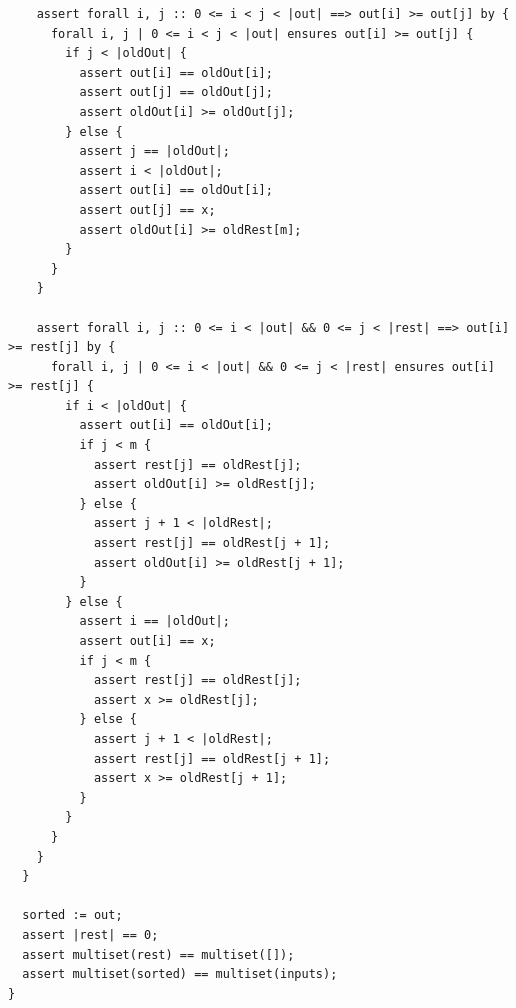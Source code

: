 \documentclass{article}
\begin{document}
\begin{lstlisting}
    assert forall i, j :: 0 <= i < j < |out| ==> out[i] >= out[j] by {
      forall i, j | 0 <= i < j < |out| ensures out[i] >= out[j] {
        if j < |oldOut| {
          assert out[i] == oldOut[i];
          assert out[j] == oldOut[j];
          assert oldOut[i] >= oldOut[j];
        } else {
          assert j == |oldOut|;
          assert i < |oldOut|;
          assert out[i] == oldOut[i];
          assert out[j] == x;
          assert oldOut[i] >= oldRest[m];
        }
      }
    }

    assert forall i, j :: 0 <= i < |out| && 0 <= j < |rest| ==> out[i] >= rest[j] by {
      forall i, j | 0 <= i < |out| && 0 <= j < |rest| ensures out[i] >= rest[j] {
        if i < |oldOut| {
          assert out[i] == oldOut[i];
          if j < m {
            assert rest[j] == oldRest[j];
            assert oldOut[i] >= oldRest[j];
          } else {
            assert j + 1 < |oldRest|;
            assert rest[j] == oldRest[j + 1];
            assert oldOut[i] >= oldRest[j + 1];
          }
        } else {
          assert i == |oldOut|;
          assert out[i] == x;
          if j < m {
            assert rest[j] == oldRest[j];
            assert x >= oldRest[j];
          } else {
            assert j + 1 < |oldRest|;
            assert rest[j] == oldRest[j + 1];
            assert x >= oldRest[j + 1];
          }
        }
      }
    }
  }

  sorted := out;
  assert |rest| == 0;
  assert multiset(rest) == multiset([]);
  assert multiset(sorted) == multiset(inputs);
}
\end{lstlisting}
\end{document}
